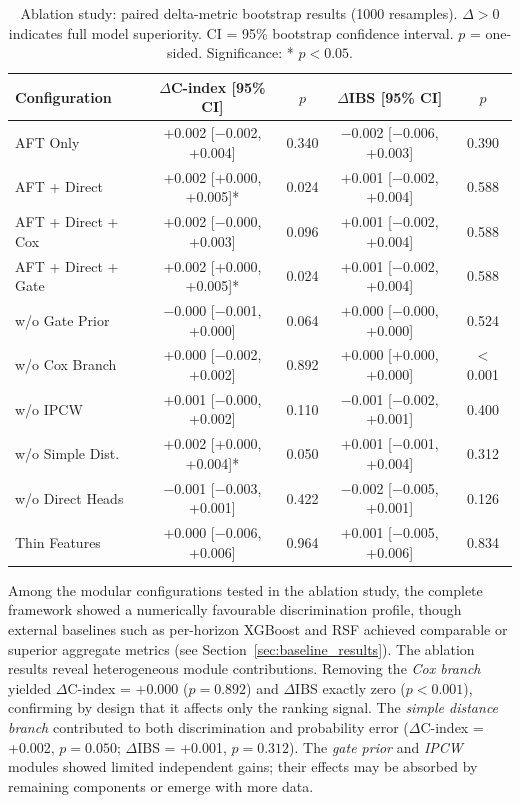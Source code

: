 \documentclass[fire,article,submit,pdftex]{../Definitions/mdpi}
\begin{document}
\begin{table}[!ht]
\caption{Ablation study: paired delta-metric bootstrap results (1000 resamples). $\Delta > 0$ indicates full model superiority. CI = 95\% bootstrap confidence interval. $p$ = one-sided. Significance: * $p < 0.05$.}\label{tab:ablation}
\small
\begin{tabular}{lcccc}
\toprule
\textbf{Configuration} & \textbf{$\Delta$C-index [95\% CI]} & \textbf{$p$} & \textbf{$\Delta$IBS [95\% CI]} & \textbf{$p$} \\
\midrule
AFT Only           & +0.002 [$-$0.002, +0.004] & 0.340 & $-$0.002 [$-$0.006, +0.003] & 0.390 \\
AFT + Direct       & +0.002 [+0.000, +0.005]* & 0.024 & +0.001 [$-$0.002, +0.004] & 0.588 \\
AFT + Direct + Cox & +0.002 [$-$0.000, +0.003] & 0.096 & +0.001 [$-$0.002, +0.004] & 0.588 \\
AFT + Direct + Gate & +0.002 [+0.000, +0.005]* & 0.024 & +0.001 [$-$0.002, +0.004] & 0.588 \\
w/o Gate Prior     & $-$0.000 [$-$0.001, +0.000] & 0.064 & +0.000 [$-$0.000, +0.000] & 0.524 \\
w/o Cox Branch     & +0.000 [$-$0.002, +0.002] & 0.892 & +0.000 [+0.000, +0.000] & $<$0.001 \\
w/o IPCW           & +0.001 [$-$0.000, +0.002] & 0.110 & $-$0.001 [$-$0.002, +0.001] & 0.400 \\
w/o Simple Dist.   & +0.002 [+0.000, +0.004]* & 0.050 & +0.001 [$-$0.001, +0.004] & 0.312 \\
w/o Direct Heads   & $-$0.001 [$-$0.003, +0.001] & 0.422 & $-$0.002 [$-$0.005, +0.001] & 0.126 \\
Thin Features      & +0.000 [$-$0.006, +0.006] & 0.964 & +0.001 [$-$0.005, +0.006] & 0.834 \\
\bottomrule
\end{tabular}
\end{table}

Among the modular configurations tested in the ablation study, the complete framework showed a numerically favourable discrimination profile, though external baselines such as per-horizon XGBoost and RSF achieved comparable or superior aggregate metrics (see Section~\ref{sec:baseline_results}).
The ablation results reveal heterogeneous module contributions.
Removing the \emph{Cox branch} yielded $\Delta$C-index = +0.000 ($p = 0.892$) and $\Delta$IBS exactly zero ($p < 0.001$), confirming by design that it affects only the ranking signal.
The \emph{simple distance branch} contributed to both discrimination and probability error ($\Delta$C-index = +0.002, $p = 0.050$; $\Delta$IBS = +0.001, $p = 0.312$).
The \emph{gate prior} and \emph{IPCW} modules showed limited independent gains; their effects may be absorbed by remaining components or emerge with more data.
\end{document}
